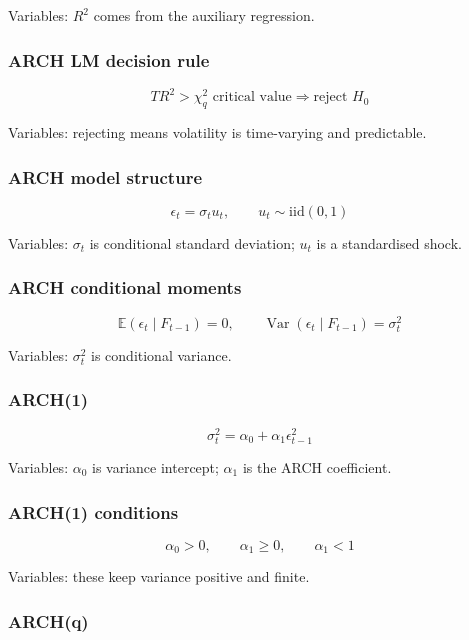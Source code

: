 \documentclass[
  8pt,
  twocolumn]{extarticle}
\begin{document}
Variables: \(R^2\) comes from the auxiliary regression.

\subsubsection{ARCH LM decision rule}\label{arch-lm-decision-rule}

\[
TR^2>\chi_q^2\text{ critical value}\Rightarrow \text{reject }H_0
\]

Variables: rejecting means volatility is time-varying and predictable.

\subsubsection{ARCH model structure}\label{arch-model-structure}

\[
\epsilon_t=\sigma_tu_t,\qquad u_t\sim\mathrm{iid}(0,1)
\]

Variables: \(\sigma_t\) is conditional standard deviation; \(u_t\) is a
standardised shock.

\subsubsection{ARCH conditional moments}\label{arch-conditional-moments}

\[
\mathbb E(\epsilon_t\mid F_{t-1})=0,\qquad \operatorname{Var}(\epsilon_t\mid F_{t-1})=\sigma_t^2
\]

Variables: \(\sigma_t^2\) is conditional variance.

\subsubsection{ARCH(1)}\label{arch1}

\[
\sigma_t^2=\alpha_0+\alpha_1\epsilon_{t-1}^2
\]

Variables: \(\alpha_0\) is variance intercept; \(\alpha_1\) is the ARCH
coefficient.

\subsubsection{ARCH(1) conditions}\label{arch1-conditions}

\[
\alpha_0>0,\qquad \alpha_1\ge0,\qquad \alpha_1<1
\]

Variables: these keep variance positive and finite.

\subsubsection{ARCH(q)}\label{archq}
\end{document}
